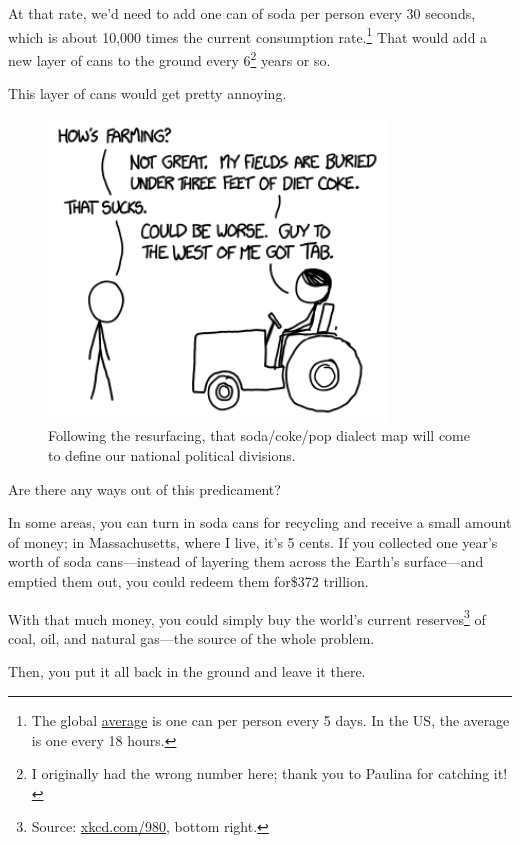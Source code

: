 {{At that rate, we'd need to add one can of soda per person every 30 seconds, which is about 10,000 times the current consumption rate.{\footnote{The global \href{http://what-if.xkcd.com/74/}{average} is one can per person every 5 days. In the US, the average is one every 18 hours.} } That would add a new layer of cans to the ground every 6{\footnote{I originally had the wrong number here; thank you to Paulina for catching it!} } years or so.}

{This layer of cans would get pretty annoying.}

\begin{figure}[!htbp]
\centering
\includegraphics[scale=0.5, max width=0.8\textwidth]{imgs/a/88/soda_annoying.png}
\caption{Following the resurfacing, that soda/coke/pop dialect map will come to define our national political divisions.}
\end{figure}

{Are there any ways out of this predicament?}

{In some areas, you can turn in soda cans for recycling and receive a small amount of money; in Massachusetts, where I live, it's 5 cents. If you collected one year's worth of soda cans—instead of layering them across the Earth's surface—and emptied them out, you could redeem them for\$372 trillion.}

{With that much money, you could simply buy the world's current reserves{\footnote{Source: \href{http://xkcd.com/980}{xkcd.com/980}, bottom right.} } of coal, oil, and natural gas—the source of the whole problem.}

{Then, you put it all back in the ground and leave it there.}

}
